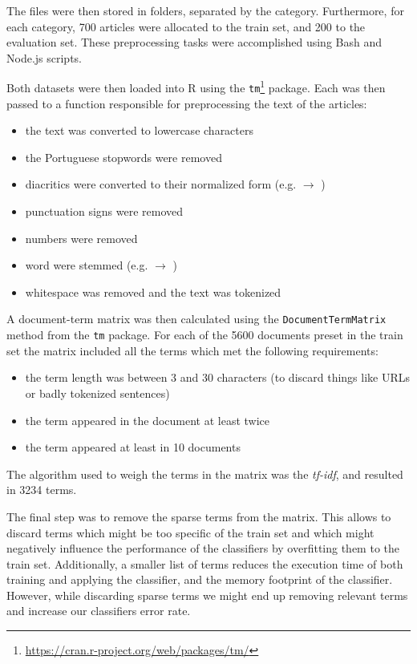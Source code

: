 \documentclass[conference]{IEEEtran}
\begin{document}
The files were then stored in folders, separated by the category.
Furthermore, for each category, 700 articles were allocated to the
train set, and 200 to the evaluation set. These preprocessing tasks
were accomplished using Bash and Node.js scripts.

Both datasets were then loaded into R using the
\texttt{tm}\footnote{\url{https://cran.r-project.org/web/packages/tm/}}
package. Each was then passed to a function responsible for
preprocessing the text of the articles:

\begin{itemize}
    \item the text was converted to lowercase characters
    \item the Portuguese stopwords were removed
    \item diacritics were converted to their normalized form (e.g.
         $\rightarrow$ )
    \item punctuation signs were removed
    \item numbers were removed
    \item word were stemmed (e.g.  $\rightarrow$
        )
    \item whitespace was removed and the text was tokenized
\end{itemize}

A document-term matrix was then calculated using the
\texttt{DocumentTermMatrix} method from the \texttt{tm} package.
For each of the 5600 documents preset in the train set the matrix
included all the terms which met the following requirements:

\begin{itemize}
    \item the term length was between 3 and 30 characters (to discard
        things like URLs or badly tokenized sentences)
    \item the term appeared in the document at least twice
    \item the term appeared at least in 10 documents
\end{itemize}
The algorithm used to weigh the terms in the matrix was the
\textit{tf-idf}\cite{christopher2008introduction}, and resulted in 3234 terms.


The final step was to remove the sparse terms from the matrix.
This allows to discard terms which might be too specific of the train
set and which might negatively influence the performance of the
classifiers by overfitting them to the train set. Additionally, a
smaller list of terms reduces the execution time of both training and
applying the classifier, and the memory footprint of the classifier.
However, while discarding sparse terms we might end up removing
relevant terms and increase our classifiers error rate.
\end{document}
